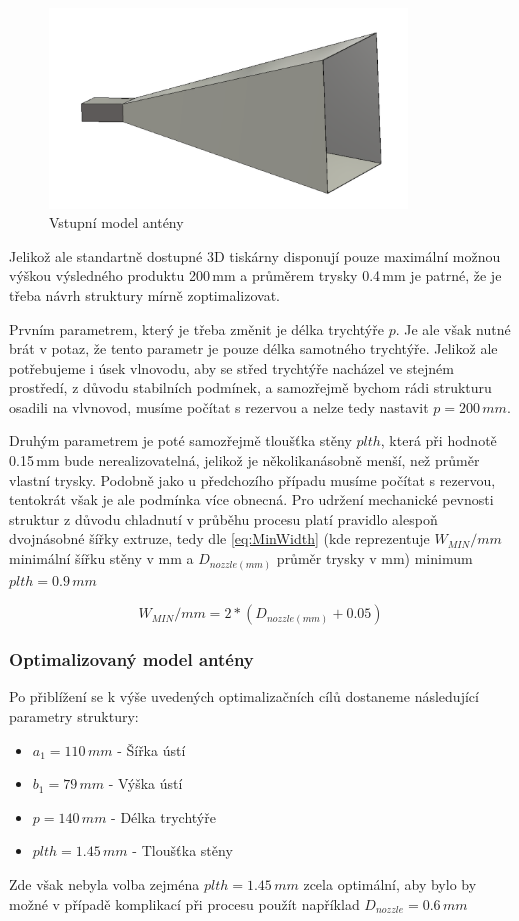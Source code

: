 \begin{figure}[h]
\begin{center}
\includegraphics[width=9.5cm]{pics/HornOptimal}
\caption{Vstupní model antény}
\label{fig:hornOptimal}
\end{center}
\end{figure}

Jelikož ale standartně dostupné 3D tiskárny disponují pouze maximální možnou výškou výsledného produktu 200\,mm a průměrem trysky 0.4\,mm je patrné, že je třeba návrh struktury mírně zoptimalizovat.

Prvním parametrem, který je třeba změnit je délka trychtýře $p$. Je ale však nutné brát v potaz, že tento parametr je pouze délka samotného trychtýře. Jelikož ale potřebujeme i úsek vlnovodu, aby se střed trychtýře nacházel ve stejném prostředí, z důvodu stabilních podmínek, a samozřejmě bychom rádi strukturu osadili na vlvnovod, musíme počítat s rezervou a nelze tedy nastavit  $p=200\,mm$.

Druhým parametrem je poté samozřejmě tloušťka stěny $plth$, která při hodnotě 0.15\,mm bude nerealizovatelná, jelikož je několikanásobně menší, než průměr vlastní trysky. Podobně jako u předchozího případu musíme počítat s rezervou, tentokrát však je ale podmínka více obnecná. Pro udržení mechanické pevnosti struktur z důvodu chladnutí v průběhu procesu platí pravidlo alespoň dvojnásobné šířky extruze, tedy dle \ref{eq:MinWidth} (kde reprezentuje $W_{MIN}/mm$ minimální šířku stěny v mm a $D_{nozzle(mm)}$ průměr trysky v mm) minimum $plth = 0.9\,mm$

\begin{equation}
W_{MIN}/mm = 2*(D_{nozzle(mm)}+0.05)
\label{eq:MinWidth}
\end{equation}

\subsubsection{Optimalizovaný model antény}
Po přiblížení se k výše uvedených optimalizačních cílů dostaneme následující parametry struktury:
\begin{itemize}
\item $a_1 = 110\,mm$ - Šířka ústí
\item $b_1 = 79\,mm$ - Výška ústí
\item $p = 140\,mm$ - Délka trychtýře
\item $plth = 1.45\,mm$ - Tloušťka stěny
\end{itemize}
Zde však nebyla volba zejména $plth = 1.45\,mm$ zcela optimální, aby bylo by možné v případě komplikací při procesu použít například $D_{nozzle} = 0.6\,mm$ 

